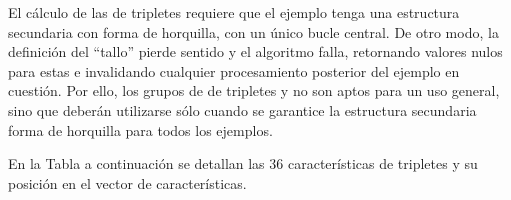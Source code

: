 %
El cálculo de las  de tripletes requiere que el ejemplo
tenga una estructura secundaria con forma de horquilla, con un único
bucle central.
De otro modo, la definición del ``tallo'' pierde sentido y el
algoritmo falla, retornando valores nulos para estas  e
invalidando cualquier procesamiento posterior del ejemplo en cuestión.
Por ello, los grupos de  de tripletes  y  no
son aptos para un uso general, sino que deberán utilizarse sólo cuando
se garantice la estructura secundaria forma de horquilla para todos
los ejemplos.

En la Tabla a continuación se detallan las $36$ características de
tripletes \cite{xue} y su posición en el vector de características.
